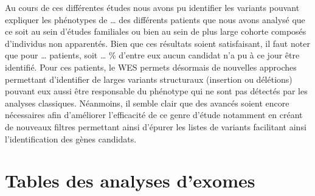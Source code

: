 \documentclass[12pt,twoside]{reedthesis}
\theoremstyle{definition}
\theoremstyle{definition}
\theoremstyle{remark}
\begin{document}
  Au cours de ces différentes études nous avons pu identifier les variants
  pouvant expliquer les phénotypes de \ldots{} des différents patients que
  nous avons analysé que ce soit au sein d'études familiales ou bien au
  sein de plus large cohorte composés d'individus non apparentés. Bien que
  ces résultats soient satisfaisant, il faut noter que pour \ldots{}
  patients, soit \ldots{} \% d'entre eux aucun candidat n'a pu à ce jour
  être identifié. Pour ces patients, le WES permets désormais de nouvelles
  approches permettant d'identifier de larges variants structuraux
  (insertion ou délétions) pouvant eux aussi être responsable du phénotype
  qui ne sont pas détectés par les analyses classiques. Néanmoins, il
  semble clair que des avancés soient encore nécessaires afin d'améliorer
  l'efficacité de ce genre d'étude notamment en créant de nouveaux filtres
  permettant ainsi d'épurer les listes de variants facilitant ainsi
  l'identification des gènes candidats.
  
  \appendix
  
  \chapter{Tables des analyses d'exomes}\label{sssdd}
  
  \newpage
  
\end{document}
